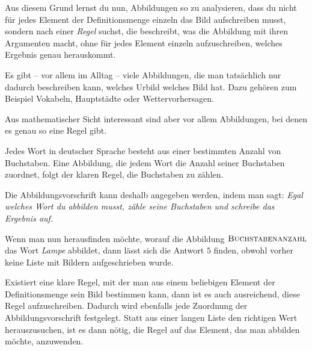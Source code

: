 \documentclass[../../main.tex]{subfiles}
\begin{document}
Aus diesem Grund lernst du nun, Abbildungen so zu analysieren, dass du nicht für jedes Element der Definitionsmenge einzeln das Bild aufschreiben musst, sondern nach einer \emph{Regel} suchst, die beschreibt, was die Abbildung mit ihren Argumenten macht, ohne für jedes Element einzeln aufzuschreiben, welches Ergebnis genau herauskommt. 

Es gibt -- vor allem im Alltag -- viele Abbildungen, die man tatsächlich nur dadurch beschreiben kann, welches Urbild welches Bild hat. Dazu gehören zum Beispiel Vokabeln, Hauptstädte oder Wettervorhersagen.

Aus mathematischer Sicht interessant sind aber vor allem Abbildungen, bei denen es genau so eine Regel gibt.

\begin{example}

    Jedes Wort in deutscher Sprache besteht aus einer bestimmten Anzahl von Buchstaben. Eine Abbildung, die jedem Wort die Anzahl seiner Buchstaben zuordnet, folgt der klaren Regel, die Buchstaben zu zählen.
    
    Die Abbildungsvorschrift kann deshalb angegeben werden, indem man sagt: \emph{Egal welches Wort du abbilden musst, zähle seine Buchstaben und schreibe das Ergebnis auf.} 
    
    Wenn man nun herausfinden möchte, worauf die Abbildung $\textsc{Buchstabenanzahl}$ das Wort \emph{Lampe} abbildet, dann lässt sich die Antwort $5$ finden, obwohl vorher keine Liste mit Bildern aufgeschrieben wurde.
\end{example}

Existiert eine klare Regel, mit der man aus einem beliebigen Element der Definitionsmenge sein Bild bestimmen kann, dann ist es auch ausreichend, diese Regel aufzuschreiben. Dadurch wird ebenfalls jede Zuordnung der Abbildungsvorschrift festgelegt. Statt aus einer langen Liste den richtigen Wert herauszusuchen, ist es dann nötig, die Regel auf das Element, das man abbilden möchte, anzuwenden.
\end{document}
